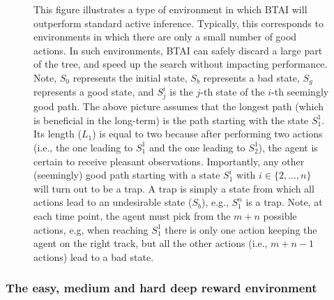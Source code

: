 \documentclass[twoside,11pt]{article}
\begin{document}
{\begin{figure}[H]
\begin{center}
 	\end{center}
\vspace{-0.25cm}
    \caption{
This figure illustrates a type of environment in which BTAI will outperform standard active inference. Typically, this corresponds to environments in which there are only a small number of good actions. In such environments, BTAI can safely discard a large part of the tree, and speed up the search without impacting performance. Note, $S_0$ represents the initial state, $S_b$ represents a bad state, $S_g$ represents a good state, and $S^i_j$ is the $j$-th state of the $i$-th seemingly good path.
The above picture assumes that the longest path (which is beneficial in the long-term) is the path starting with the state $S^1_1$. Its length ($L_1$) is equal to two because after performing two actions (i.e., the one leading to $S^1_1$ and the one leading to $S^1_2$), the agent is certain to receive pleasant observations. Importantly, any other (seemingly) good path starting with a state $S^i_1$ with $i \in \{2, ..., n\}$ will turn out to be a trap. A trap is simply a state from which all actions lead to an undesirable state ($S_b$), e.g., $S^n_1$ is a trap. Note, at each time point, the agent must pick from the $m + n$ possible actions, e.g, when reaching $S^1_1$ there is only one action keeping the agent on the right track, but all the other actions (i.e., $m + n - 1$ actions) lead to a bad state.}
    \label{fig:graph_env}
\end{figure}
}

\subsubsection{The easy, medium and hard deep reward environment}\label{sssec:instances}
\end{document}
